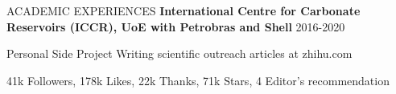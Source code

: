 \documentclass{resume} %
\newenvironment{indentpar}[1]%
  {\begin{list}{}%
          {\setlength{\leftmargin}{#1}}%
          \item[]%
  }
  {\end{list}}
\begin{document}
\begin{rSection}{ACADEMIC EXPERIENCES}
\textbf{International Centre for Carbonate Reservoirs (ICCR), UoE with Petrobras and Shell} \hfill {2016-2020}
\end{rSection}


\begin{rSection}{Personal Side Project}
Writing scientific outreach articles at zhihu.com

    \begin{indentpar}{0.5cm}
    41k Followers, 178k Likes, 22k Thanks, 71k Stars, 4 Editor's recommendation
    \end{indentpar}

\end{rSection}
\end{document}
